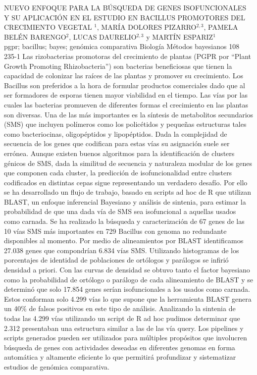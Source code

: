 \A
{NUEVO ENFOQUE PARA LA BÚSQUEDA DE GENES ISOFUNCIONALES Y SU APLICACIÓN EN EL ESTUDIO EN BACILLUS PROMOTORES DEL CRECIMIENTO VEGETAL}
{$^1$, MARÍA DOLORES PIZARRO$^{2,3}$, PAMELA BELÉN BARENGO$^2$, LUCAS DAURELIO$^{2,3}$ y MARTÍN ESPARIZ$^1$}
{
\\}
{pgpr; bacillus; bayes; genómica comparativa} 
 {Biología} 
 {Métodos bayesianos} 
 {108} 
 {235-1}
{Las rizobacterias promotoras del crecimiento de plantas (PGPR por “Plant Growth Promoting Rhizobacteria”) son bacterias beneficiosas que tienen la capacidad de colonizar las raíces de las plantas y promover su crecimiento. Los Bacillus son preferidos a la hora de formular productos comerciales dado que al ser formadores de esporas tienen mayor viabilidad en el tiempo. Las vías por las cuales las bacterias promueven de diferentes formas el crecimiento en las plantas son diversas. Una de las más importantes es la síntesis de metabolitos secundarios (SMS) que incluyen polímeros como los policétidos y pequeñas estructuras tales como bacteriocinas, oligopéptidos y lipopéptidos. Dada la complejidad de secuencia de los genes que codifican para estas vías su asignación suele ser errónea. Aunque existen buenos algoritmos para la identificación de clusters génicos de SMS, dada la similitud de secuencia y naturaleza modular de los genes que componen cada cluster, la predicción de isofuncionalidad entre clusters codificados en distintas cepas sigue representando un verdadero desafío. Por ello se ha desarrollado un flujo de trabajo, basado en scripts ad hoc de R que utilizan BLAST, un enfoque inferencial Bayesiano y análisis de sintenia, para estimar la probabilidad de que una dada vía de SMS sea isofuncional a aquellas usados como carnada. Se ha realizado la búsqueda y caracterización de 67 genes de las 10 vías SMS más importantes en 729 Bacillus con genoma no redundante disponibles al momento. Por medio de alineamientos por BLAST identificamos 27.038 genes que compondrían 6.834 vías SMS. Utilizando histogramas de los porcentajes de identidad de poblaciones de ortólogos y parálogos se infirió densidad a priori. Con las curvas de densidad se obtuvo tanto el factor bayesiano como la probabilidad de ortólogo o parálogo de cada alineamiento de BLAST y se determinó que solo 17.854 genes serían isofuncionales a los usados como carnada. Estos conforman solo 4.299 vías lo que supone que la herramienta BLAST genera un 40\% de falsos positivos en este tipo de análisis. Analizando la sintenia de todas las 4.299 vías utilizando un script de R ad hoc pudimos determinar que 2.312 presentaban una estructura similar a las de las vía query. Los pipelines y scripts generados pueden ser utilizados para múltiples propósitos que involucren búsqueda de genes con actividades deseadas en diferentes genomas en forma automática y altamente eficiente lo que permitirá profundizar y sistematizar estudios de genómica comparativa. }

